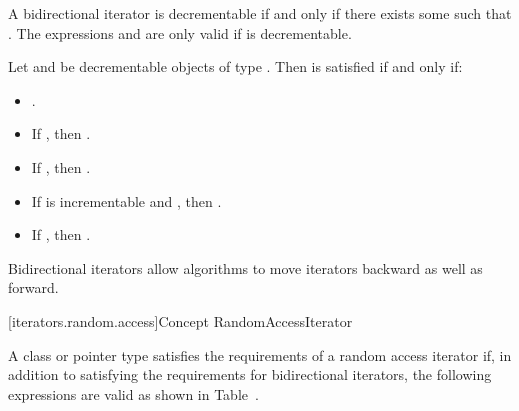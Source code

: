 
\begin{addedblock}
\pnum
A bidirectional iterator  is decrementable if and only if there exists some  such that
. The expressions  and  are only valid if  is
decrementable.

\pnum
Let  and  be decrementable objects of type . Then
 is satisfied if and only if:

\begin{itemize}
\item {}.
\item If , then .
\item If , then .
\item If  is incrementable and , then
      .
\item If , then .
\end{itemize}
\end{addedblock}

\begin{removedblock}
\pnum
\enternote
Bidirectional iterators allow algorithms to move iterators backward as well as forward.
\exitnote
\end{removedblock}

[iterators.random.access]{Concept RandomAccessIterator}

\begin{removedblock}
\pnum
A class or pointer type
satisfies the requirements of a random access iterator if,
in addition to satisfying the requirements for bidirectional iterators,
the following expressions are valid as shown in Table~.
\end{removedblock}

